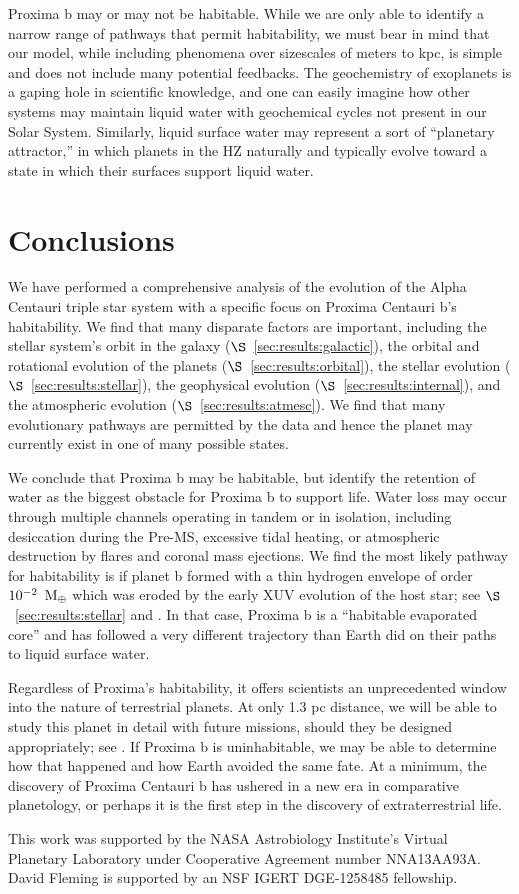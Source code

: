 \documentclass[preprint,12pt]{aastex}
\def\mearth{{\rm\,M_\oplus}}
\begin{document}
Proxima b may or may not be habitable. While we are only able to
identify a narrow range of pathways that permit habitability, we must
bear in mind that our model, while including phenomena over sizescales
of meters to kpc, is simple and does not include many potential
feedbacks. The geochemistry of exoplanets is a gaping hole in
scientific knowledge, and one can easily imagine how other systems may
maintain liquid water with geochemical cycles not present in our Solar
System. Similarly, liquid surface water may represent a sort of
``planetary attractor,'' in which planets in the HZ naturally and
typically evolve toward a state in which their surfaces support liquid
water. 

\section{Conclusions\label{sec:concl}}
We have performed a comprehensive analysis of the evolution of the
Alpha Centauri triple star system with a specific focus on Proxima Centauri b's
habitability. We find that many disparate factors are important,
including the stellar system's orbit in the galaxy
($\S$~\ref{sec:results:galactic}), the orbital and rotational evolution of
the planets ($\S$~\ref{sec:results:orbital}), the stellar evolution
($\S$~\ref{sec:results:stellar}), the geophysical evolution
($\S$~\ref{sec:results:internal}), and the atmospheric evolution
($\S$~\ref{sec:results:atmesc}). We find that many evolutionary pathways
are permitted by the data and hence the planet may currently exist in
one of many possible states.

We conclude that Proxima b may be habitable, but identify the
retention of water as the biggest obstacle for Proxima b to support
life. Water loss may occur through multiple channels operating in
tandem or in isolation, including desiccation during the Pre-MS,
excessive tidal heating, or atmospheric destruction by flares and
coronal mass ejections. We find the most likely pathway for
habitability is if planet b formed with a thin hydrogen envelope of
order $10^{-2}~\mearth$ which was eroded by the early XUV evolution of
the host star; see $\S$~\ref{sec:results:stellar} and \cite{Luger15}. In
that case, Proxima b is a ``habitable evaporated core'' and has
followed a very different trajectory than Earth did on their paths to
liquid surface water.

Regardless of Proxima's habitability, it offers scientists an
unprecedented window into the nature of terrestrial planets. At only
1.3 pc distance, we will be able to study this planet in detail with
future missions, should they be designed appropriately; see
\cite{Meadows16}. If Proxima b is uninhabitable, we may be able to
determine how that happened and how Earth avoided the same fate. At a
minimum, the discovery of Proxima Centauri b has ushered in a new era
in comparative planetology, or perhaps it is the first step in the
discovery of extraterrestrial life.
 
\vspace{1cm}
This work was supported by the NASA Astrobiology Institute's Virtual
Planetary Laboratory under Cooperative Agreement number NNA13AA93A.
David Fleming is supported by an NSF IGERT DGE-1258485 fellowship.



\end{document}
